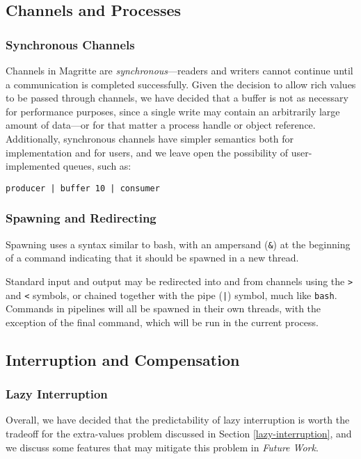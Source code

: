 \documentclass[english,PRO]{ipsj}
\begin{document}
\subsection{Channels and Processes}
\subsubsection{Synchronous Channels}\noindent
Channels in Magritte are \emph{synchronous}---readers and writers cannot continue until a communication is completed successfully. Given the decision to allow rich values to be passed through channels, we have decided that a buffer is not as necessary for performance purposes, since a single write may contain an arbitrarily large amount of data---or for that matter a process handle or object reference. Additionally, synchronous channels have simpler semantics both for implementation and for users, and we leave open the possibility of user-implemented queues, such as:
\begin{lstlisting}
producer | buffer 10 | consumer
\end{lstlisting}

\subsubsection{Spawning and Redirecting}\noindent
Spawning uses a syntax similar to bash, with an ampersand (\verb/&/) at the beginning of a command indicating that it should be spawned in a new thread.

Standard input and output may be redirected into and from channels using the \verb/>/ and \verb/</ symbols, or chained together with the pipe (\verb/|/) symbol, much like \verb/bash/. Commands in pipelines will all be spawned in their own threads, with the exception of the final command, which will be run in the current process.

\subsection{Interruption and Compensation}
\subsubsection{Lazy Interruption}\noindent
Overall, we have decided that the predictability of lazy interruption is worth the tradeoff for the extra-values problem discussed in Section \ref{lazy-interruption}, and we discuss some features that may mitigate this problem in \emph{Future Work}.
\end{document}
